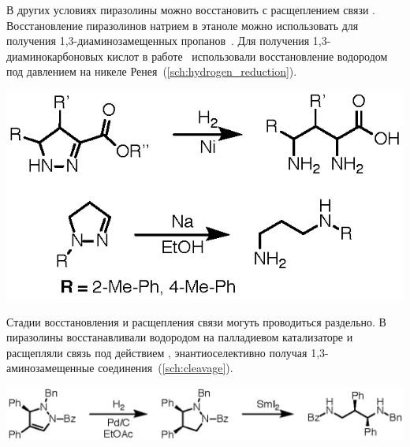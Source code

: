 В других условиях пиразолины можно восстановить с расщеплением связи .
Восстановление пиразолинов натрием в этаноле можно использовать для получения 1,3-диаминозамещенных пропанов~\cite{Chemistry1967}.
Для получения 1,3-диаминокарбоновых кислот в работе~\cite{Carter1949} использовали восстановление водородом под давлением на никеле Ренея~(\ref{sch:hydrogen_reduction}).

\begin{scheme}[h!]
    \centering
    \includegraphics{sections/literature/img/hydrogen_reduction.eps}
    \caption{}
    \label{sch:hydrogen_reduction}
\end{scheme}

Стадии восстановления и расщепления связи  могуть проводиться раздельно.
В~\cite{Hashimoto2013} пиразолины восстанавливали водородом на палладиевом катализаторе и расщепляли связь  под действием , энантиоселективно получая 1,3-аминозамещенные соединения~(\ref{sch:cleavage}).

\begin{scheme}[h!]
    \centering
    \includegraphics{sections/literature/img/cleavage.eps}
    \caption{}
    \label{sch:cleavage}
\end{scheme}